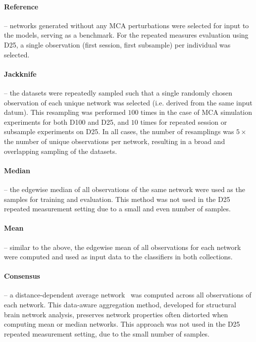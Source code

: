 \documentclass[10pt]{SelfArx} %
\begin{document}
\paragraph{Reference} – networks generated without any MCA perturbations were selected for input to the models, serving
as a benchmark. For the repeated measures evaluation using D25, a single observation (first session, first subsample)
per individual was selected.

\paragraph{Jackknife} – the datasets were repeatedly sampled such that a single randomly chosen observation of each
unique network was selected (i.e. derived from the same input datum). This resampling was performed $100$ times in the
case of MCA simulation experiments for both D100 and D25, and $10$ times for repeated session or subsample experiments
on D25. In all cases, the number of resamplings was $5\times$ the number of unique observations per network, resulting
in a broad and overlapping sampling of the datasets.

\paragraph{Median} – the edgewise median of all observations of the same network were used as the samples for training
and evaluation. This method was not used in the D25 repeated measurement setting due to a small and even number of
samples.

\paragraph{Mean} – similar to the above, the edgewise mean of all observations for each network were computed and used
as input data to the classifiers in both collections.

\paragraph{Consensus} – a distance-dependent average network~\cite{Betzel2018-eo} was computed across all observations
of each network. This data-aware aggregation method, developed for structural brain network analysis, preserves network
properties often distorted when computing mean or median networks. This approach was not used in the D25 repeated
measurement setting, due to the small number of samples.
\end{document}
